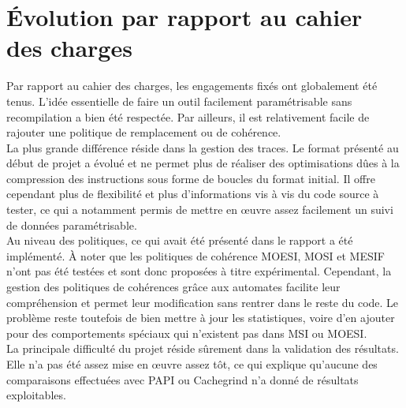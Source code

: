 \section{\'Evolution par rapport au cahier des charges}

Par rapport au cahier des charges, les engagements fixés ont globalement été tenus. L'idée essentielle de faire un outil facilement paramétrisable sans recompilation a bien été respectée. Par ailleurs, il est relativement facile de rajouter une politique de remplacement ou de cohérence. \\

La plus grande différence réside dans la gestion des traces. Le format présenté au début de projet a évolué et ne permet plus de réaliser des optimisations dûes à la compression des instructions sous forme de boucles du format initial. Il offre cependant plus de flexibilité et plus d'informations vis à vis du code source à tester, ce qui a notamment permis de mettre en {\oe}uvre assez facilement un suivi de données paramétrisable. \\

Au niveau des politiques, ce qui avait été présenté dans le rapport a été implémenté. \`A noter que les politiques de cohérence MOESI, MOSI et MESIF n'ont pas été testées et sont donc proposées à titre expérimental. Cependant, la gestion des politiques de cohérences grâce aux automates facilite leur compréhension et permet leur modification sans rentrer dans le reste du code. Le problème reste toutefois de bien mettre à jour les statistiques, voire d'en ajouter pour des comportements spéciaux qui n'existent pas dans MSI ou MOESI. \\

La principale difficulté du projet réside sûrement dans la validation des résultats. Elle n'a pas été assez mise en \oe uvre assez tôt, ce qui explique qu'aucune des comparaisons effectuées avec \textsf{PAPI} ou \textsf{Cachegrind} n'a donné de résultats exploitables.
